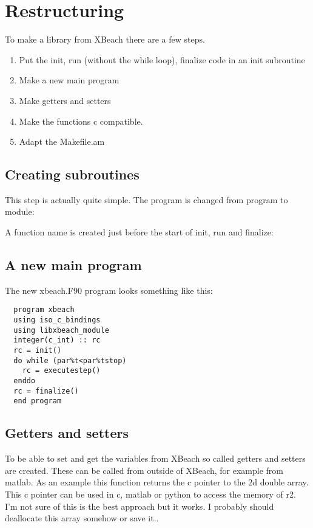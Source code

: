 \documentclass{article}
\begin{document}
\section{Restructuring}
To make a library from XBeach there are a few steps. 
\begin{enumerate}
\item Put the init, run (without the while loop), finalize code in an init subroutine
\item Make a new main program
\item Make getters and setters
\item Make the functions c compatible.
\item Adapt the Makefile.am
\end{enumerate}

\subsection{Creating subroutines}
This step is actually quite simple. 
The program is changed from program to module:

A function name is created just before the start of init, run and finalize:




\subsection{A new main program}
The new xbeach.F90 program looks something like this:
\begin{lstlisting}
  program xbeach
  using iso_c_bindings
  using libxbeach_module
  integer(c_int) :: rc
  rc = init()
  do while (par%t<par%tstop)
    rc = executestep()
  enddo
  rc = finalize()
  end program
\end{lstlisting}

\subsection{Getters and setters}
To be able to set and get the variables from XBeach so called getters and setters are created. These can be called from outside of XBeach, for example from matlab. 
As an example this function returns the c pointer to the 2d double array. This c pointer can be used in c, matlab or python to access the memory of r2. I'm not sure of this is the best approach but it works.  I probably should deallocate this array somehow or save it..

\end{document}
